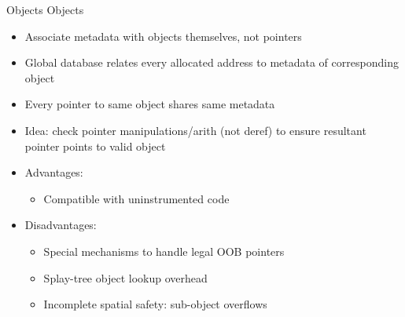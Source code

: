 \documentclass[aspectratio=169]{beamer}
\begin{document}
\begin{frame}{Objects}
Objects
    \begin{itemize}[<+->]
        \item Associate metadata with \alert{objects} themselves, not pointers
        \item Global database relates every allocated address to metadata of corresponding object
        \item Every pointer to same object shares same metadata
        \item Idea: check pointer manipulations/arith (not deref) to ensure resultant pointer points to valid object
        \item Advantages:
        \begin{itemize}
            \item Compatible with uninstrumented code 
        \end{itemize}
        \item Disadvantages:
        \begin{itemize}
            \item Special mechanisms to handle legal OOB pointers 
            \item Splay-tree object lookup overhead
            \item Incomplete spatial safety: sub-object overflows 


        \end{itemize}
    \end{itemize}
\end{frame}


\end{document}
